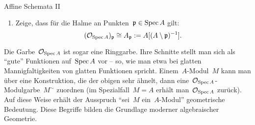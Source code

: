 \documentclass{uebblatt}
\begin{document}
\begin{aufgabe}{Affine Schemata II}
\begin{enumerate}
\item Zeige, dass für die Halme an Punkten~$\mathfrak{p} \in \operatorname{Spec} A$ gilt:
\[ (\mathcal{O}_{\operatorname{Spec} A})_{\mathfrak{p}} \cong A_{\mathfrak{p}} := A[(A \setminus \mathfrak{p})^{-1}]. \]
\end{enumerate}

Die Garbe~$\mathcal{O}_{\operatorname{Spec} A}$ ist sogar eine Ringgarbe. Ihre Schnitte stellt man
sich als "`gute"' Funktionen auf~$\operatorname{Spec} A$ vor -- so, wie man etwa bei glatten
Mannigfaltigkeiten von glatten Funktionen spricht. Einem~$A$-Modul~$M$ kann man
über eine Konstruktion, die der obigen sehr ähnelt, dann eine~$\mathcal{O}_{\operatorname{Spec}
A}$-Modulgarbe~$M^\sim$ zuordnen (im Spezialfall~$M = A$ erhält man~$\mathcal{O}_{\operatorname{Spec}
A}$ zurück). Auf diese Weise erhält der Ausspruch "`sei~$M$ ein~$A$-Modul"'
geometrische Bedeutung. Diese Begriffe bilden die Grundlage moderner
algebraischer Geometrie.
\end{aufgabe}
\end{document}
